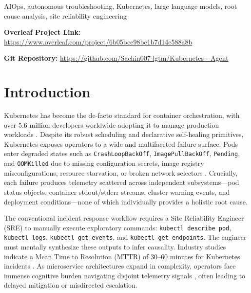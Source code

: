 \documentclass[12pt,onecolumn,draftclsnofoot]{IEEEtran}
\begin{document}
\begin{IEEEkeywords}
AIOps, autonomous troubleshooting, Kubernetes, large language models, root cause analysis, site reliability engineering
\end{IEEEkeywords}

\noindent\textbf{Overleaf Project Link:} \url{https://www.overleaf.com/project/6b05bce98bc1b7d14e588a8b}

\noindent\textbf{Git Repository:} \url{https://github.com/Sachin007-lgtm/Kubernetes---Agent}

\section{Introduction}

Kubernetes has become the de-facto standard for container orchestration, with over 5.6 million developers worldwide adopting it to manage production workloads \cite{cncf2023survey}. Despite its robust scheduling and declarative self-healing primitives, Kubernetes exposes operators to a wide and multifaceted failure surface. Pods enter degraded states such as \texttt{CrashLoopBackOff}, \texttt{ImagePullBackOff}, \texttt{Pending}, and \texttt{OOMKilled} due to missing configuration secrets, image registry misconfigurations, resource starvation, or broken network selectors \cite{burns2016borg,brewer2016kubernetes}. Crucially, each failure produces telemetry scattered across independent subsystems—pod status objects, container stdout/stderr streams, cluster warning events, and deployment conditions—none of which individually provides a holistic root cause.

The conventional incident response workflow requires a Site Reliability Engineer (SRE) to manually execute exploratory commands: \texttt{kubectl describe pod}, \texttt{kubectl logs}, \texttt{kubectl get events}, and \texttt{kubectl get endpoints}. The engineer must mentally synthesize these outputs to infer causality. Industry studies indicate a Mean Time to Resolution (MTTR) of 30--60 minutes for Kubernetes incidents \cite{dynatrace2023incident}. As microservice architectures expand in complexity, operators face immense cognitive burden navigating disjoint telemetry signals \cite{sridharan2018distributed}, often leading to delayed mitigation or misdirected escalation.
\end{document}
